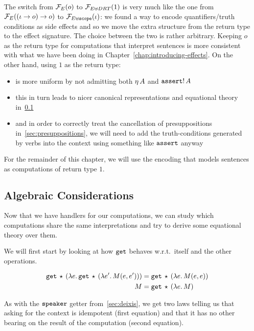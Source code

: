 The switch from $\mathcal{F}_E(o)$ to $\mathcal{F}_{E \uplus DRT}(1)$ is very much like the
one from $\mathcal{F}_E((\iota \to o) \to o)$ to
$\mathcal{F}_{E \uplus \mathtt{scope}}(\iota)$: we found a way to encode
quantifiers/truth conditions as side effects and so we move the extra
structure from the return type to the effect signature. The choice between
the two is rather arbitrary. Keeping $o$ as the return type for
computations that interpret sentences is more consistent with what we have
been doing in Chapter~\ref{chap:introducing-effects}. On the other hand,
using $1$ as the return type:

\begin{itemize}
\item is more uniform by not admitting both $\eta\,A$ and
  $\mathtt{assert}!\,A$
\item this in turn leads to nicer canonical representations and equational
  theory in~\ref{ssec:algebraic-drt}
\item and in order to correctly treat the cancellation of presuppositions
  in~\ref{sec:presuppositions}, we will need to add the truth-conditions
  generated by verbs into the context using something like $\mathtt{assert}$
  anyway
\end{itemize}

For the remainder of this chapter, we will use the encoding that models
sentences as computations of return type $1$.


\subsection{Algebraic Considerations}
\label{ssec:algebraic-drt}

Now that we have handlers for our computations, we can study which
computations share the same interpretations and try to derive some
equational theory over them.

We will first start by looking at how $\mathtt{get}$ behaves w.r.t.\ itself and
the other operations.

\begin{align*}
   \mathtt{get}\,\star\,(\lambda e.\, \mathtt{get}\,\star\,(\lambda e'.\, M(e, e')))
&= \mathtt{get}\,\star\,(\lambda e.\, M(e, e)) \\
   M
&= \mathtt{get}\,\star\,(\lambda e.\, M)
\end{align*}

As with the $\mathtt{speaker}$ getter from~\ref{sec:deixis}, we get two laws
telling us that asking for the context is idempotent (first equation) and
that it has no other bearing on the result of the computation (second
equation).

